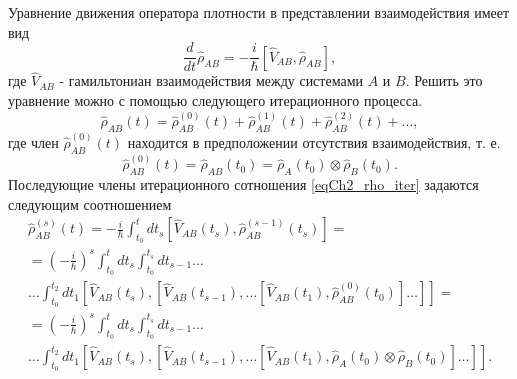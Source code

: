 Уравнение движения оператора плотности в представлении взаимодействия
имеет вид 
\[
\frac{d}{d t}\hat{\rho}_{AB} = 
- \frac{i}{\hbar}\left[\hat{V}_{AB}, \hat{\rho}_{AB}\right],
\]
где $\hat{V}_{AB}$ - гамильтониан взаимодействия между системами $A$ 
и $B$.  Решить это уравнение можно с помощью следующего итерационного процесса.
\begin{equation}
\hat{\rho}_{AB}\left(t\right) = 
\hat{\rho}^{(0)}_{AB}\left(t\right) +
\hat{\rho}^{(1)}_{AB}\left(t\right) +
\hat{\rho}^{(2)}_{AB}\left(t\right) + \dots,
\label{eqCh2_rho_iter}
\end{equation}
где член \(\hat{\rho}^{(0)}_{AB}\left(t\right)\) находится в предположении
отсутствия взаимодействия, т. е.
\[
\hat{\rho}^{(0)}_{AB}\left(t\right) = \hat{\rho}_{AB}\left(t_0\right) = 
\hat{\rho}_{A}\left(t_0\right)
\otimes
\hat{\rho}_{B}\left(t_0\right).
\]
Последующие члены итерационного сотношения \eqref{eqCh2_rho_iter} задаются следующим соотношением
\begin{eqnarray}
\hat{\rho}^{(s)}_{AB}\left(t\right) = - \frac{i}{\hbar}\int_{t_0}^{t} dt_s
\left[\hat{V}_{AB}\left(t_s\right), \hat{\rho}^{(s - 1)}_{AB}\left(t_s\right)
\right] = 
\nonumber \\
= \left(- \frac{i}{\hbar}\right)^{s}\int_{t_0}^{t} dt_{s}
\int_{t_0}^{t_s} dt_{s -1} \dots
\nonumber \\
\dots \int_{t_0}^{t_2} dt_1 
\left[\hat{V}_{AB}\left(t_s\right), 
\left[\hat{V}_{AB}\left(t_{s -1}\right),
\dotsc
\left[\hat{V}_{AB}\left(t_1\right),
\hat{\rho}^{(0)}_{AB}\left(t_0\right)
\right]
\dots
\right]
\right] =
\nonumber \\
= \left(- \frac{i}{\hbar}\right)^{s}\int_{t_0}^{t} dt_{s}
\int_{t_0}^{t_{s}} dt_{s - 1} \dots
\nonumber \\
\dots \int_{t_0}^{t_2} dt_1 
\left[\hat{V}_{AB}\left(t_s\right), 
\left[\hat{V}_{AB}\left(t_{s-1}\right),
\dotsc
\left[\hat{V}_{AB}\left(t_1\right),
\hat{\rho}_{A}\left(t_0\right)
\otimes
\hat{\rho}_{B}\left(t_0\right)
\right]
\dotsc
\right]
\right].
\label{eqCh2_rho_iter_member}
\end{eqnarray}

